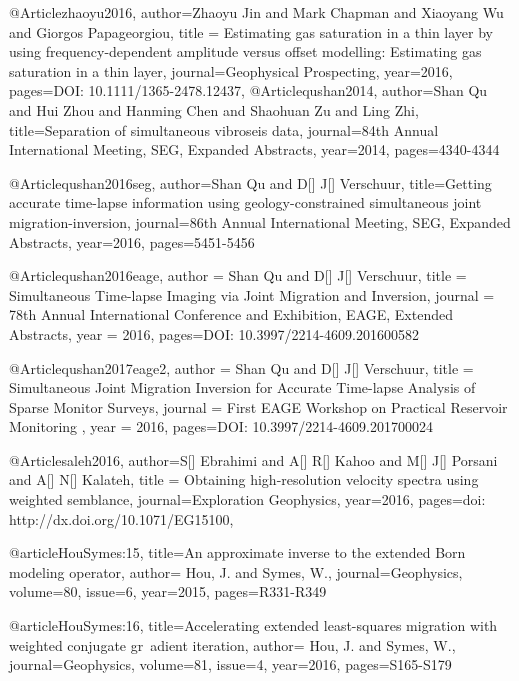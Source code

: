 @Article{zhaoyu2016,
  author={Zhaoyu Jin and Mark Chapman and Xiaoyang Wu and Giorgos Papageorgiou},
  title = {Estimating gas saturation in a thin layer by using frequency-dependent amplitude versus offset modelling: Estimating gas saturation in a thin layer},
  journal={Geophysical Prospecting},
  year=2016,
  pages={DOI: 10.1111/1365-2478.12437},
}
@Article{qushan2014,
  author={Shan Qu and Hui Zhou and Hanming Chen and Shaohuan Zu and Ling Zhi},
  title={Separation of simultaneous vibroseis data},
  journal={84th Annual International Meeting, SEG, Expanded Abstracts},
  year=2014,
  pages={4340-4344}
}

@Article{qushan2016seg,
  author={Shan Qu and D[] J[] Verschuur},
  title={Getting accurate time-lapse information using geology-constrained simultaneous joint migration-inversion},
  journal={86th Annual International Meeting, SEG, Expanded Abstracts},
  year=2016,
  pages={5451-5456}
}


@Article{qushan2016eage,
  author = 	 {Shan Qu and D[] J[] Verschuur},
  title = 	 {Simultaneous Time-lapse Imaging via Joint Migration and Inversion},
  journal = 	 { 78th Annual International Conference and Exhibition, EAGE, Extended Abstracts},
  year = 	 2016,
  pages={DOI: 10.3997/2214-4609.201600582}}
  

@Article{qushan2017eage2,
  author = 	 {Shan Qu and D[] J[] Verschuur},
  title = 	 {Simultaneous Joint Migration Inversion for Accurate Time-lapse Analysis of Sparse Monitor Surveys},
  journal = 	 { First EAGE Workshop on Practical Reservoir Monitoring },
  year = 	 2016,
  pages={DOI: 10.3997/2214-4609.201700024}}
  
  

@Article{saleh2016,
  author={S[] Ebrahimi and A[] R[] Kahoo and M[] J[] Porsani and A[] N[] Kalateh},
  title = {Obtaining high-resolution velocity spectra using weighted semblance},
  journal={Exploration Geophysics},
  year=2016,
  pages={doi: http://dx.doi.org/10.1071/EG15100},
}

@article{HouSymes:15,
title={An approximate inverse to the extended {B}orn modeling operator},
author= {Hou, J. and Symes, W.},
journal={Geophysics},
volume={80},
issue={6},
year={2015},
pages={R331-R349}
}

@article{HouSymes:16,
title={Accelerating extended least-squares migration with weighted conjugate gr\
adient iteration},
author= {Hou, J. and Symes, W.},
journal={Geophysics},
volume={81},
issue={4},
year={2016},
pages={S165-S179}
}

